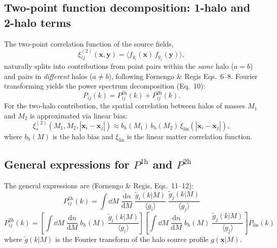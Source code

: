 \documentclass[10pt,a4paper]{article}
\newcommand{\vect}[1]{\mathbf{#1}}
\newcommand{\ddn}{\frac{\mathrm{d}n}{\mathrm{d}M}}
\newcommand{\Plin}{P_{\mathrm{lin}}}
\begin{document}
\subsection{Two-point function decomposition: 1-halo and 2-halo terms}

The two-point correlation function of the source fields,
\begin{equation}
\xi_{ij}^{(2)}(\vect{x}, \vect{y}) = \langle f_{g_i}(\vect{x}) \, f_{g_j}(\vect{y}) \rangle,
\end{equation}
naturally splits into contributions from point pairs within the \textit{same} halo ($a = b$) and pairs in \textit{different} halos ($a \neq b$), following Fornengo \& Regis Eqs.~6--8. Fourier transforming yields the power spectrum decomposition (Eq.~10):
\begin{equation}
\label{eq:P_decomposition}
P_{ij}(k) = P_{ij}^{\mathrm{1h}}(k) + P_{ij}^{\mathrm{2h}}(k).
\end{equation}
For the two-halo contribution, the spatial correlation between halos of masses $M_1$ and $M_2$ is approximated via linear bias:
\begin{equation}
\xi_s^{(2)}(M_1, M_2, |\vect{x}_i - \vect{x}_j|) \approx b_h(M_1) \, b_h(M_2) \, \xi_{\mathrm{lin}}(|\vect{x}_i - \vect{x}_j|),
\end{equation}
where $b_h(M)$ is the halo bias and $\xi_{\mathrm{lin}}$ is the linear matter correlation function.

\subsection{General expressions for $P^{\mathrm{1h}}$ and $P^{\mathrm{2h}}$}

The general expressions are (Fornengo \& Regis, Eqs.~11--12):
\begin{equation}
\label{eq:P1h_general}
\boxed{
P_{ij}^{\mathrm{1h}}(k) = \int \dd M \; \ddn \; \frac{\tilde{g}_i(k | M)}{\langle g_i \rangle} \; \frac{\tilde{g}_j(k | M)}{\langle g_j \rangle}
}
\end{equation}
\begin{equation}
\label{eq:P2h_general}
\boxed{
P_{ij}^{\mathrm{2h}}(k) = \left[\int \dd M \; \ddn \; b_h(M) \; \frac{\tilde{g}_i(k | M)}{\langle g_i \rangle}\right] \left[\int \dd M \; \ddn \; b_h(M) \; \frac{\tilde{g}_j(k | M)}{\langle g_j \rangle}\right] \Plin(k)
}
\end{equation}
where $\tilde{g}(k | M)$ is the Fourier transform of the halo source profile $g(\vect{x} | M)$.
\end{document}
